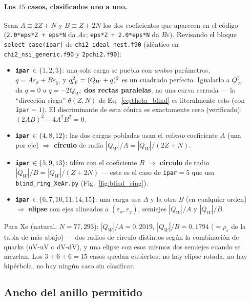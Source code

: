 \documentclass[11pt,a4paper]{article}
\newcommand{\eps}{\varepsilon}
\newcommand{\QW}{Q_{W}}
\newcommand{\qeff}{q_{\rm eff}}
\newcommand{\code}[1]{\texttt{#1}}
\begin{document}
\paragraph{Los $15$ casos, clasificados uno a uno.} Sean $A\equiv 2Z+N$ y
$B\equiv Z+2N$ los dos coeficientes que aparecen en el c\'odigo (\code{2.0*eps*Z
+ eps*N} da $A\eps$; \code{eps*Z + 2.0*eps*N} da $B\eps$). Revisando el bloque
\code{select case(ipar)} de \code{chi2\_ideal\_nest.f90} (id\'entico en
\code{chi2\_nsi\_generic.f90} y \code{2pchi2.f90}):
\begin{itemize}\itemsep2pt
  \item \textbf{\code{ipar}$\,\in\{1,2,3\}$}: una sola carga se puebla con
    \emph{ambos} par\'ametros, $q=A\eps_{x}+B\eps_{y}$, y $\qeff^{2}=(\QW+q)^{2}$
    es un cuadrado perfecto. Igualarlo a $\QW^{2}$ da $q=0$ o $q=-2\QW$: \textbf{dos
    rectas paralelas}, no una curva cerrada --- la ``direcci\'on ciega''
    $\theta(Z,N)$ de Eq.~\eqref{eq:theta_blind} es literalmente esto (con
    \code{ipar}$=1$). El discriminante de esta c\'onica es exactamente cero
    (verificado): $(2AB)^{2}-4A^{2}B^{2}=0$.
  \item \textbf{\code{ipar}$\,\in\{4,8,12\}$}: las dos cargas pobladas usan el
    \emph{mismo} coeficiente $A$ (una por eje) $\Rightarrow$ \textbf{c\'irculo} de
    radio $|\QW|/A=|\QW|/(2Z+N)$.
  \item \textbf{\code{ipar}$\,\in\{5,9,13\}$}: id\'em con el coeficiente $B$
    $\Rightarrow$ \textbf{c\'irculo} de radio $|\QW|/B=|\QW|/(Z+2N)$ --- este es
    el caso de \code{ipar}$=5$ que usa \code{blind\_ring\_XeAr.py}
    (Fig.~\ref{fig:blind_ring}).
  \item \textbf{\code{ipar}$\,\in\{6,7,10,11,14,15\}$}: una carga usa $A$ y la otra
    $B$ (en cualquier orden) $\Rightarrow$ \textbf{elipse} con ejes alineados a
    $(\eps_{x},\eps_{y})$, semiejes $|\QW|/A$ y $|\QW|/B$.
\end{itemize}
Para Xe (natural, $N=77{,}293$): $|\QW|/A=0{,}2019$, $|\QW|/B=0{,}1794$
($=\rho_{\eps}$ de la tabla de m\'as abajo) --- dos radios de c\'irculo distintos
seg\'un la combinaci\'on de quarks (uV-uV o dV-dV), y una elipse con esos mismos
dos semiejes cuando se mezclan. Los $3+6+6=15$ casos quedan cubiertos: no hay
elipse rotada, no hay hip\'erbola, no hay ning\'un caso sin clasificar.

\subsection{Ancho del anillo permitido}
\label{sec:anillo}
\end{document}
